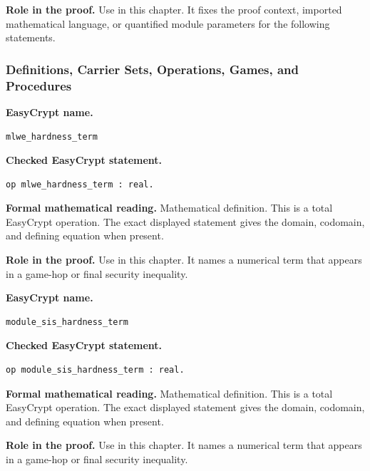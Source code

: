 \noindent\textbf{Role in the proof.}
Use in this chapter. It fixes the proof context, imported mathematical language, or quantified module parameters for the following statements.

\subsubsection*{Definitions, Carrier Sets, Operations, Games, and Procedures}
\begin{formaldefinition}
\noindent\textbf{EasyCrypt name.}
\begin{lstlisting}[language=EasyCrypt,basicstyle=\ttfamily\scriptsize]
mlwe_hardness_term
\end{lstlisting}
\noindent\textbf{Checked EasyCrypt statement.}
\begin{lstlisting}[language=EasyCrypt,basicstyle=\ttfamily\scriptsize]
op mlwe_hardness_term : real.
\end{lstlisting}
\noindent\textbf{Formal mathematical reading.}
Mathematical definition. This is a total EasyCrypt operation.  The exact displayed statement gives the domain, codomain, and defining equation when present.

\noindent\textbf{Role in the proof.}
Use in this chapter. It names a numerical term that appears in a game-hop or final security inequality.

\end{formaldefinition}

\begin{formaldefinition}
\noindent\textbf{EasyCrypt name.}
\begin{lstlisting}[language=EasyCrypt,basicstyle=\ttfamily\scriptsize]
module_sis_hardness_term
\end{lstlisting}
\noindent\textbf{Checked EasyCrypt statement.}
\begin{lstlisting}[language=EasyCrypt,basicstyle=\ttfamily\scriptsize]
op module_sis_hardness_term : real.
\end{lstlisting}
\noindent\textbf{Formal mathematical reading.}
Mathematical definition. This is a total EasyCrypt operation.  The exact displayed statement gives the domain, codomain, and defining equation when present.

\noindent\textbf{Role in the proof.}
Use in this chapter. It names a numerical term that appears in a game-hop or final security inequality.

\end{formaldefinition}

